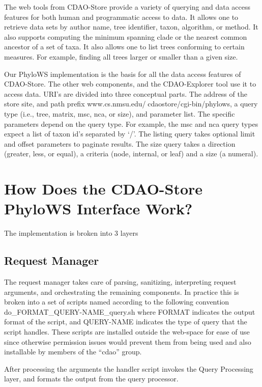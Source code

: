 \documentclass[10pt]{article}
\begin{document}
The web tools from CDAO-Store provide a variety of querying and data access features for both human and programmatic access to data. It allows one to retrieve data sets by author name, tree identifier, taxon, algorithm, or method. It also supports computing the minimum spanning clade or the nearest common ancestor of a set of taxa. It also allows one to list trees conforming to certain measures. For example, finding all trees larger or smaller than a given size. 

Our PhyloWS implementation is the basis for all the data access features of CDAO-Store. The other web components, and the CDAO-Explorer tool use it to access data. URI's are divided into three conceptual parts. The address of the store site, and path prefix www.cs.nmsu.edu/cdaostore/cgi-bin/phylows, a query type (i.e., tree, matrix, msc, nca, or size), and parameter list. The specific parameters depend on the query type. For example, the msc and nca query types expect a list of taxon id's separated by `/'. The listing query takes optional limit and offset parameters to paginate results. The size query takes a direction (greater, less, or equal), a criteria (node, internal, or leaf) and a size (a numeral).

\section{How Does the CDAO-Store PhyloWS Interface Work?}
The implementation is broken into 3 layers
  \subsection{Request Manager}
    The request manager takes care of parsing, sanitizing, interpreting request arguments, and orchestrating  
   the remaining components. 
     In practice this is broken into a set of scripts named according to the following convention 
     do\_FORMAT\_QUERY-NAME\_query.sh where FORMAT indicates the output format of the script, and QUERY-NAME
     indicates the type of query that the script handles. These scripts are installed outside the web-space for
     ease of use since otherwise permission issues would prevent them from being used and also installable by
     members of the ``cdao'' group.

     After processing the arguments the handler script invokes the Query Processing layer, and formats the output
     from the query processor.
\end{document}
